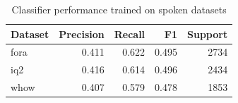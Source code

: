 \begin{table}[t]
\caption{Classifier performance trained on spoken datasets}
\label{tab:metrics}
\begin{tabular}{lrrrr}
\toprule
Dataset & Precision & Recall & F1 & Support \\
\midrule
fora & 0.411 & 0.622 & 0.495 & 2734 \\
iq2 & 0.416 & 0.614 & 0.496 & 2434 \\
whow & 0.407 & 0.579 & 0.478 & 1853 \\
\bottomrule
\end{tabular}
\end{table}
